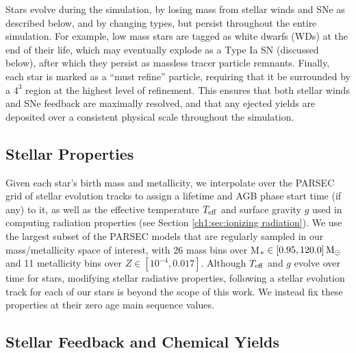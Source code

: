 Stars evolve during the simulation, by losing mass from stellar winds and SNe as described below, and by changing types, but persist throughout the entire simulation. For example, low mass stars are tagged as white dwarfs (WDs) at the end of their life, which may eventually explode as a Type Ia SN (discussed below), after which they persist as massless tracer particle remnants. Finally, each star is marked as a ``must refine'' particle, requiring that it be surrounded by a $4^3$ region at the highest level of refinement. This ensures that both stellar winds and SNe feedback are maximally resolved, and that any ejected yields are deposited over a consistent physical scale throughout the simulation.

\subsection{Stellar Properties}
\label{ch1:sec:properties}
Given each star's birth mass and metallicity, we interpolate over the PARSEC grid of stellar evolution tracks \citep{Bressan2012} to assign a lifetime and AGB phase start time (if any) to it, as well as the effective temperature $T_{\rm eff}$ and surface gravity $g$ used in computing radiation properties (see Section \ref{ch1:sec:ionizing radiation}). We use the largest subset of the PARSEC models that are regularly sampled in our mass/metallicity space of interest, with 26 mass bins over M$_{*} \in \left[0.95, 120.0 \right] {\rm M_{\odot}}$ and 11 metallicity bins over $Z \in \left[10^{-4}, 0.017 \right]$. Although $T_{\rm eff}$ and $g$ evolve over time for stars, modifying stellar radiative properties, following a stellar evolution track for each of our stars is beyond the scope of this work. We instead fix these properties at their zero age main sequence values.

\subsection{Stellar Feedback and Chemical Yields}

